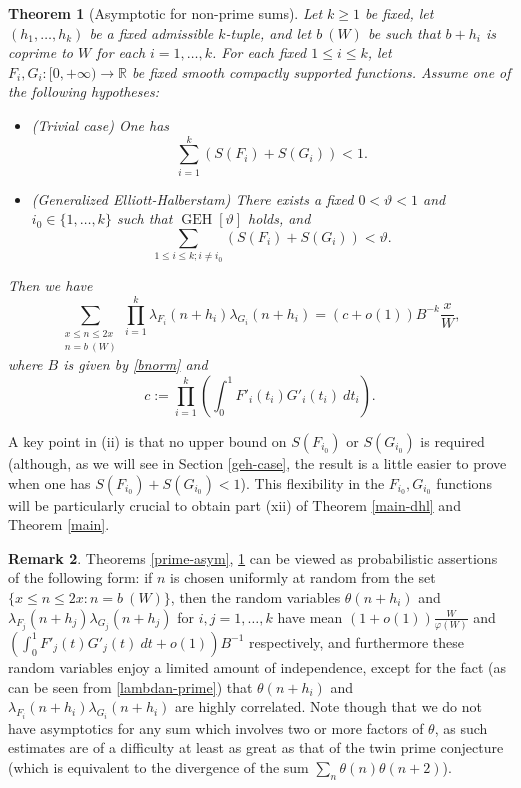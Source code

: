 \documentclass{bmcart}
\DeclareMathOperator*\GEH{GEH}
\theoremstyle{plain}
\newtheorem{theorem}{Theorem}[section]
\theoremstyle{definition}
\newtheorem{remark}[theorem]{Remark}
\newcommand\R{\mathbb{R}}
\renewcommand{\phi}{\varphi}
\begin{document}
\begin{theorem}[Asymptotic for non-prime sums]\label{nonprime-asym}  Let $k \geq 1$ be fixed, let $(h_1,\dots,h_k)$ be a fixed admissible $k$-tuple, and let $b\ (W)$ be such that $b+h_i$ is coprime to $W$ for each $i=1,\dots,k$.  For each fixed $1 \leq i \leq k$, let $F_{i}, G_{i}: [0,+\infty) \to \R$ be fixed smooth compactly supported functions.  Assume one of the following hypotheses:
\begin{itemize}
\item[(i)]  (Trivial case)  One has
\begin{equation}\label{easy-upper}
\sum_{i=1}^k ( S(F_i) + S(G_i) ) < 1.
\end{equation}
\item[(ii)]  (Generalized Elliott-Halberstam) There exists a fixed $0 < \vartheta < 1$ and $i_0 \in \{1,\dots,k\}$ such that $\GEH[\vartheta]$ holds, and
\begin{equation}\label{eh-upper}
\sum_{1 \leq i \leq k; i \neq i_0} ( S(F_{i}) + S(G_{i}) ) < \vartheta.
\end{equation}
\end{itemize}
Then we have
\begin{equation}\label{lflg}
 \sum_{\substack{x \leq n \leq 2x\\ n = b\ (W)}} \prod_{i=1}^k \lambda_{F_{i}}(n+h_{i}) \lambda_{G_{i}}(n+h_{i}) =
(c+o(1)) B^{-k} \frac{x}{W},
\end{equation}
where $B$ is given by \eqref{bnorm} and
\begin{equation}\label{c-def}
 c := \prod_{i=1}^k \left(\int_0^1 F'_i(t_i) G'_i(t_i)\ dt_i\right).
\end{equation}
\end{theorem}

A key point in (ii) is that no upper bound on $S(F_{i_0})$ or $S(G_{i_0})$ is required (although, as we will see in Section \ref{geh-case}, the result is a little easier to prove when one has $S(F_{i_0})+S(G_{i_0}) < 1$).  This flexibility in the $F_{i_0}, G_{i_0}$ functions will be particularly crucial to obtain part (xii) of Theorem \ref{main-dhl} and Theorem \ref{main}.

\begin{remark}  Theorems \ref{prime-asym}, \ref{nonprime-asym} can be viewed as probabilistic assertions of the following form: if $n$ is chosen uniformly at random from the set $\{ x \leq n \leq 2x: n = b\ (W)\}$, then the random variables $\theta(n+h_i)$ and $\lambda_{F_j}(n+h_j) \lambda_{G_j}(n+h_j)$ for $i,j=1,\dots,k$ have mean $(1+o(1)) \frac{W}{\phi(W)}$ and $(\int_0^1 F'_j(t) G'_j(t)\ dt + o(1)) B^{-1}$ respectively, and furthermore these random variables enjoy a limited amount of independence, except for the fact (as can be seen from \eqref{lambdan-prime}) that $\theta(n+h_i)$ and $\lambda_{F_i}(n+h_i) \lambda_{G_i}(n+h_i)$ are highly correlated.  Note though that we do not have asymptotics for any sum which involves two or more factors of $\theta$, as such estimates are of a difficulty at least as great as that of the twin prime conjecture (which is equivalent to the divergence of the sum $\sum_n \theta(n) \theta(n+2)$).
\end{remark}
\end{document}

